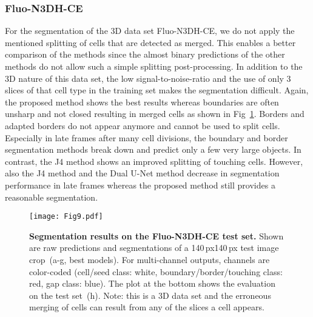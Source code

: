 \documentclass[10pt,letterpaper]{article}
\begin{document}
\subsubsection*{Fluo-N3DH-CE}
For the segmentation of the 3D data set Fluo-N3DH-CE, we do not apply the mentioned splitting of cells that are detected as merged. This enables a better comparison of the methods since the almost binary predictions of the other methods do not allow such a simple splitting post-processing. In addition to the 3D nature of this data set, the low signal-to-noise-ratio and the use of only 3 slices of that cell type in the training set makes the segmentation difficult. Again, the proposed method shows the best results whereas boundaries are often unsharp and not closed resulting in merged cells as shown in Fig~\ref{fig:fluo-n3dh-ce-results}. Borders and adapted borders do not appear anymore and cannot be used to split cells. Especially in late frames after many cell divisions, the boundary and border segmentation methods break down and predict only a few very large objects. In contrast, the J4 method shows an improved splitting of touching cells. However, also the J4 method and the Dual U-Net method decrease in segmentation performance in late frames whereas the proposed method still provides a reasonable segmentation.
\begin{figure}
\begin{adjustwidth}{-2.25in}{0in}
\centering
\texttt{[image: Fig9.pdf]}
\caption{\textbf{Segmentation results on the Fluo-N3DH-CE test set.} Shown are raw predictions and segmentations of a 140\,px140\,px test image crop~(a-g, best  models). For multi-channel outputs, channels are color-coded (cell/seed class: white, boundary/border/touching class: red, gap class: blue). The plot at the bottom shows the evaluation on the test set~(h). Note: this is a 3D data set and the erroneous merging of cells can result from any of the slices a cell appears.}
\label{fig:fluo-n3dh-ce-results}
\end{adjustwidth}
\end{figure}
\end{document}
